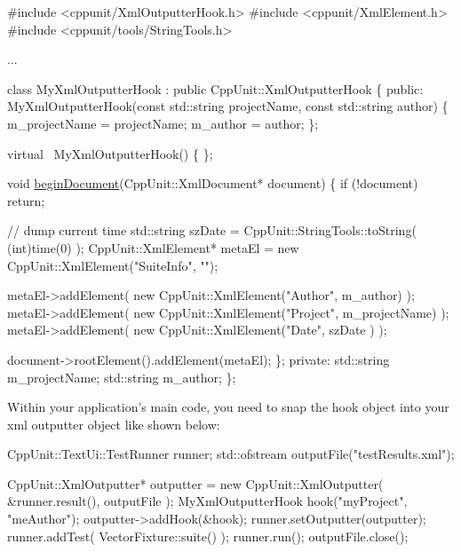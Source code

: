 \begin{DoxyCode}
\textcolor{preprocessor}{#include <cppunit/XmlOutputterHook.h>}
\textcolor{preprocessor}{#include <cppunit/XmlElement.h>}
\textcolor{preprocessor}{#include <cppunit/tools/StringTools.h>}

...

class MyXmlOutputterHook : \textcolor{keyword}{public} CppUnit::XmlOutputterHook
\{
\textcolor{keyword}{public}:
  MyXmlOutputterHook(\textcolor{keyword}{const} std::string projectName,
                     \textcolor{keyword}{const} std::string author)
  \{
     m\_projectName = projectName;
     m\_author      = author;
  \};

  \textcolor{keyword}{virtual} ~MyXmlOutputterHook()
  \{
  \};

  \textcolor{keywordtype}{void} \hyperlink{class_xml_outputter_hook_a1d2b5d5d0fc42d273d6430522a70ccbb}{beginDocument}(CppUnit::XmlDocument* document)
  \{
    \textcolor{keywordflow}{if} (!document)
      \textcolor{keywordflow}{return};

    \textcolor{comment}{// dump current time}
    std::string szDate          = CppUnit::StringTools::toString( (\textcolor{keywordtype}{int})time(0) );
    CppUnit::XmlElement* metaEl = \textcolor{keyword}{new} CppUnit::XmlElement(\textcolor{stringliteral}{"SuiteInfo"}, 
                                                          \textcolor{stringliteral}{""});

    metaEl->addElement( \textcolor{keyword}{new} CppUnit::XmlElement(\textcolor{stringliteral}{"Author"}, m\_author) );
    metaEl->addElement( \textcolor{keyword}{new} CppUnit::XmlElement(\textcolor{stringliteral}{"Project"}, m\_projectName) );
    metaEl->addElement( \textcolor{keyword}{new} CppUnit::XmlElement(\textcolor{stringliteral}{"Date"}, szDate ) );
   
    document->rootElement().addElement(metaEl);
  \};
\textcolor{keyword}{private}:
  std::string m\_projectName;
  std::string m\_author;
\}; 
\end{DoxyCode}


Within your application's main code, you need to snap the hook object into your xml outputter object like shown below\-:


\begin{DoxyCode}
CppUnit::TextUi::TestRunner runner;
std::ofstream outputFile(\textcolor{stringliteral}{"testResults.xml"});

CppUnit::XmlOutputter* outputter = \textcolor{keyword}{new} CppUnit::XmlOutputter( &runner.result(),
                                                              outputFile );    
MyXmlOutputterHook hook(\textcolor{stringliteral}{"myProject"}, \textcolor{stringliteral}{"meAuthor"});
outputter->addHook(&hook);
runner.setOutputter(outputter);    
runner.addTest( VectorFixture::suite() );   
runner.run();
outputFile.close();
\end{DoxyCode}


